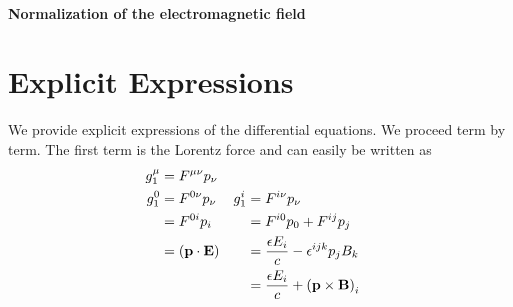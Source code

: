 \documentclass[10pt,letterpaper,extrafontsizes, onecolumn,openright]{memoir}
\begin{document}
\paragraph{Normalization of the electromagnetic field}





\section{Explicit Expressions}
We provide explicit expressions of the differential equations. We proceed term
by term. The first term is the Lorentz force and can easily be written as
  \begin{align*}
    g_1^\mu &= F^{\mu\nu}p_\nu                  &  \\
    g_1^0   &= F^{0\nu}p_\nu                    & g_1^i   &= F^{i\nu}p_\nu    \\
            &= F^{0i}p_i                       &         &= F^{i0}p_0+F^{ij}p_j        \\
            &= \left(\vb{p}\cdot\vb{E}\right)   &         &= \frac{\epsilon E_i}{c}-\epsilon^{ijk}p_jB_k \\
            &                                   &         &= \frac{\epsilon E_i}{c}+\left(\vb{p}\times\vb{B}\right)_i
  \end{align*}
\end{document}
